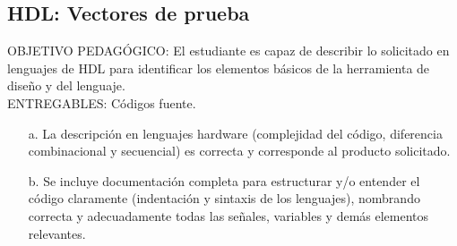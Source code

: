 \subsection{HDL: Vectores de prueba}
\scriptsize
	\begin{tcolorbox}[enhanced,title=PRODUCTO DE CALIDAD:,colframe=colorA1,colback=colorA2,arc=0mm,colbacktitle=white,fonttitle=\bfseries,coltitle=white,attach boxed title to top left={xshift=3.2mm,yshift=-0.50mm},boxed title style={skin=enhancedfirst jigsaw,size=small,arc=0mm,bottom=1mm,interior style={fill=none,top color=color2,bottom color=color2},,boxrule=0pt},boxrule=0pt]
		OBJETIVO PEDAGÓGICO: El estudiante es capaz de describir lo solicitado en lenguajes de HDL para identificar los elementos básicos de la herramienta de diseño y del lenguaje. \\
		ENTREGABLES: Códigos fuente.
		\begin{enumerate}
			\item[a.] La descripción en lenguajes hardware (complejidad del código, diferencia combinacional y secuencial) es correcta y corresponde al producto solicitado.
			\item[b.] Se incluye documentación completa para estructurar y/o entender el código claramente (indentación y sintaxis de los lenguajes), nombrando correcta y adecuadamente todas las señales, variables y demás elementos relevantes. 
		\end{enumerate}
	\end{tcolorbox}

\normalsize

	
